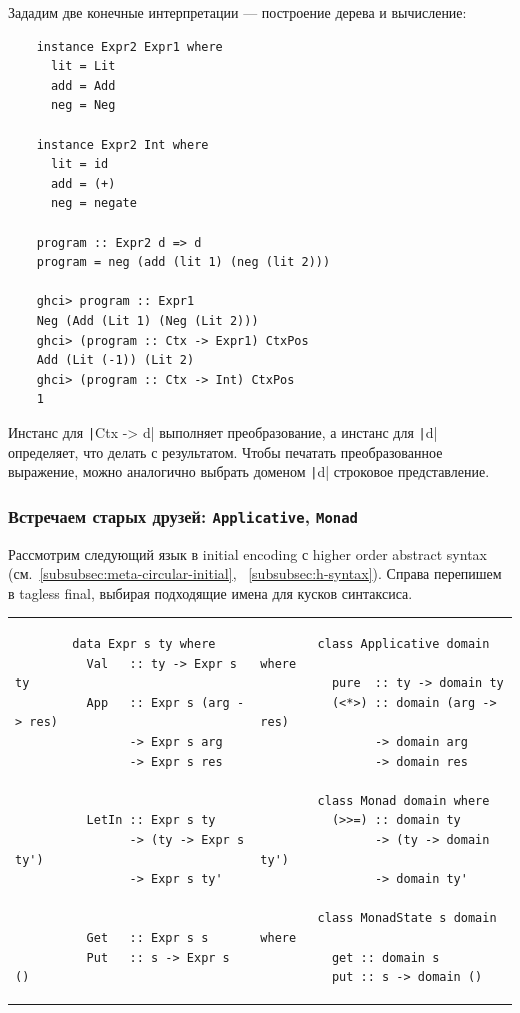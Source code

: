 Зададим две конечные интерпретации --- построение дерева и вычисление:
\begin{verbatim}
    instance Expr2 Expr1 where
      lit = Lit
      add = Add
      neg = Neg

    instance Expr2 Int where
      lit = id
      add = (+)
      neg = negate

    program :: Expr2 d => d
    program = neg (add (lit 1) (neg (lit 2)))

    ghci> program :: Expr1
    Neg (Add (Lit 1) (Neg (Lit 2)))
    ghci> (program :: Ctx -> Expr1) CtxPos
    Add (Lit (-1)) (Lit 2)
    ghci> (program :: Ctx -> Int) CtxPos
    1
\end{verbatim}
Инстанс для \texttt|Ctx -> d| выполняет преобразование, а инстанс для \texttt|d| определяет, что делать с результатом.
Чтобы печатать преобразованное выражение, можно аналогично выбрать доменом \texttt|d| строковое представление.

\subsubsection{Встречаем старых друзей: \texttt{Applicative}, \texttt{Monad}}

Рассмотрим следующий язык в initial encoding с higher order abstract syntax (см.~\ref{subsubsec:meta-circular-initial}, ~\ref{subsubsec:h-syntax}).
Справа перепишем в tagless final, выбирая подходящие имена для кусков синтаксиса.

\begin{tabular}{p{8cm}p{8cm}}
    \begin{verbatim}
        data Expr s ty where
          Val   :: ty -> Expr s ty
          App   :: Expr s (arg -> res)
                -> Expr s arg
                -> Expr s res


          LetIn :: Expr s ty
                -> (ty -> Expr s ty')
                -> Expr s ty'


          Get   :: Expr s s
          Put   :: s -> Expr s ()
    \end{verbatim}
    &
    \begin{verbatim}
        class Applicative domain where
          pure  :: ty -> domain ty
          (<*>) :: domain (arg -> res)
                -> domain arg
                -> domain res

        class Monad domain where
          (>>=) :: domain ty
                -> (ty -> domain ty')
                -> domain ty'

        class MonadState s domain where
          get :: domain s
          put :: s -> domain ()
    \end{verbatim}
\end{tabular}
\vspace{1em}

